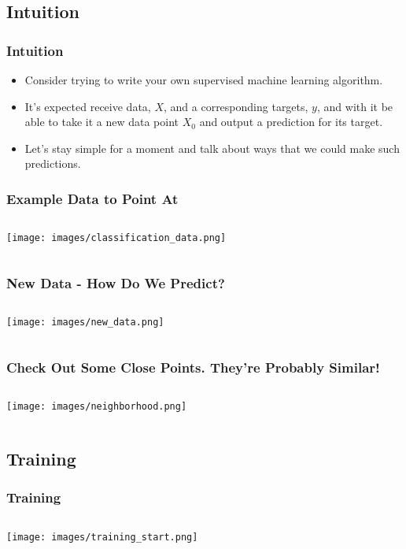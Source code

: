 \documentclass{beamer}
\begin{document}
\subsection{Intuition}
\begin{frame}
  \frametitle{Intuition}
  \begin{itemize}
    \item Consider trying to write your own supervised machine learning algorithm. \vspace{3mm}

    \item It's expected receive data, $X$, and a corresponding targets, $y$, and with it be able to take it a new data point $X_0$ and output a prediction for its target. \vspace{3mm}

    \item Let's stay simple for a moment and talk about ways that we could make such predictions.
  \end{itemize}
\end{frame}

\begin{frame}
  \frametitle{Example Data to Point At}
  \begin{columns}
    \texttt{[image: images/classification\_data.png]}
  \end{columns}
\end{frame}

\begin{frame}
  \frametitle{New Data - How Do We Predict?}
  \begin{columns}
    \texttt{[image: images/new\_data.png]}
  \end{columns}
\end{frame}

\begin{frame}
  \frametitle{Check Out Some Close Points. They're Probably Similar!}
  \begin{columns}
    \texttt{[image: images/neighborhood.png]}
  \end{columns}
\end{frame}

\subsection{Training}
\begin{frame}
  \frametitle{Training}
  \begin{columns}
    \texttt{[image: images/training\_start.png]}
  \end{columns}
\end{frame}
\end{document}
